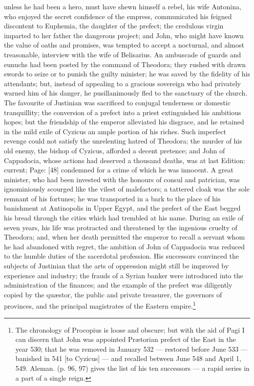 unless he had been a hero, must have shewn himself a rebel, his wife Antonina, who enjoyed the secret confidence of the empress, communicated his feigned discontent to Euphemia, the daughter of the prefect; the credulous virgin imparted to her father the dangerous project; and John, who might have known the value of oaths and promises, was tempted to accept a nocturnal, and almost treasonable, interview with the wife of Belisarius. An ambuscade of guards and eunuchs had been posted by the command of Theodora; they rushed with drawn swords to seize or to punish the guilty minister; he was saved by the fidelity of his attendants; but, instead of appealing to a gracious sovereign who had privately warned him of his danger, he pusillanimously fled to the sanctuary of the church. The favourite of Justinian was sacrificed to conjugal tenderness or domestic tranquillity; the conversion of a prefect into a priest extinguished his ambitious hopes; but the friendship of the emperor alleviated his disgrace, and he retained in the mild exile of Cyzicus an ample portion of his riches. Such imperfect revenge could not satisfy the unrelenting hatred of Theodora; the murder of his old enemy, the bishop of Cyzicus, afforded a decent pretence; and John of Cappadocia, whose actions had deserved a thousand deaths, was at last Edition: current; Page: [48] condemned for a crime of which he was innocent. A great minister, who had been invested with the honours of consul and patrician, was ignominiously scourged like the vilest of malefactors; a tattered cloak was the sole remnant of his fortunes; he was transported in a bark to the place of his banishment at Antinopolis in Upper Egypt, and the prefect of the East begged his bread through the cities which had trembled at his name. During an exile of seven years, his life was protracted and threatened by the ingenious cruelty of Theodora; and, when her death permitted the emperor to recall a servant whom he had abandoned with regret, the ambition of John of Cappadocia was reduced to the humble duties of the sacerdotal profession. His successors convinced the subjects of Justinian that the arts of oppression might still be improved by experience and industry; the frauds of a Syrian banker were introduced into the administration of the finances; and the example of the prefect was diligently copied by the quæstor, the public and private treasurer, the governors of provinces, and the principal magistrates of the Eastern empire.\footnote{The chronology of Procopius is loose and obscure; but with the aid of Pagi I can discern that John was appointed Prætorian prefect of the East in the year 530; that he was removed in January 532 \texthebrew{—} restored before June 533 \texthebrew{—} banished in 541 [to Cyzicus] \texthebrew{—} and recalled between June 548 and April 1, 549. Aleman. (p. 96, 97) gives the list of his ten successors \texthebrew{—} a rapid series in a part of a single reign.}


